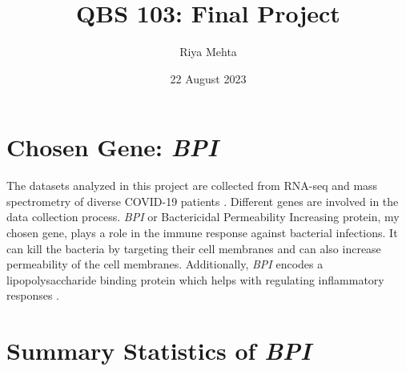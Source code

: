 \documentclass{article}
\title{QBS 103: Final Project}
\author{Riya Mehta}
\date{22 August 2023}
\begin{document}
\maketitle

\tableofcontents

\newpage

\section{Chosen Gene: \emph{BPI}}
The datasets analyzed in this project are collected from RNA-seq and mass spectrometry of diverse COVID-19 patients \cite{Overmyer2021}. Different genes are involved in the data collection process. \emph{BPI} or Bactericidal Permeability Increasing protein, my chosen gene, plays a role in the immune response against bacterial infections. It can kill the bacteria by targeting their cell membranes and can also increase permeability of the cell membranes. Additionally, \emph{BPI} encodes a lipopolysaccharide binding protein which helps with regulating inflammatory responses \cite{NCBI}.


\newpage

\section{Summary Statistics of \emph{BPI}}
\end{document}
